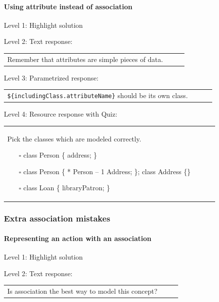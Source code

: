 \paragraph{Using attribute instead of association}

\noindent Level 1: Highlight solution \medskip

\noindent Level 2: Text response: \medskip

\begin{tabular}{|p{0.9\linewidth}}
Remember that attributes are simple pieces of data.
\end{tabular} \medskip

\noindent Level 3: Parametrized response: \medskip

\begin{tabular}{|p{0.9\linewidth}}
\verb|${includingClass.attributeName}| should be its own class.
\end{tabular} \medskip

\noindent Level 4: Resource response with Quiz: \medskip

\begin{tabular}{|p{0.9\linewidth}}
Pick the classes which are modeled correctly.

\begin{itemize}
    \item[$\square$] class Person \{ address; \}
    \item[$\square$] class Person \{ * Person -- 1 Address; \}; class Address \{\}
    \item[$\square$] class Loan \{ libraryPatron; \}
\end{itemize}

\end{tabular} \medskip


\subsubsection{Extra association mistakes}

\paragraph{Representing an action with an association}

\noindent Level 1: Highlight solution \medskip

\noindent Level 2: Text response: \medskip

\begin{tabular}{|p{0.9\linewidth}}
Is association the best way to model this concept?
\end{tabular} \medskip


